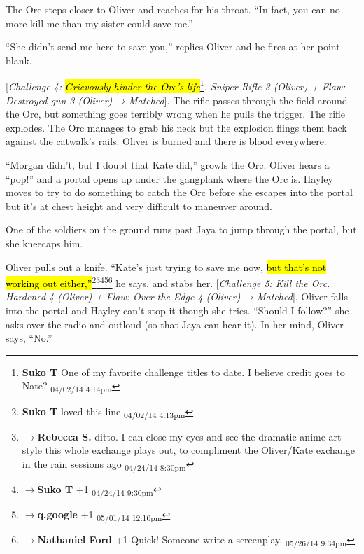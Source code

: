 The Orc steps closer to Oliver and reaches for his throat.  ``In fact, you can no more kill me than my sister could save me.''



``She didn't send me here to save you,'' replies Oliver and he fires at her point blank.



{[}\textit{Challenge 4: }\textit{\hl{Grievously hinder the Orc's life}}\footnote{\textbf{Suko T }One of my favorite challenge titles to date.  I believe credit goes to Nate? \textsubscript{04/02/14 4:14pm}}\textit{.  Sniper Rifle 3 (Oliver) + }\textit{ {\color[RGB]{255,0,0}Flaw: Destroyed gun 3 (Oliver) } }\textit{→ Matched}{]}.  The rifle passes through the field around the Orc, but something goes terribly wrong when he pulls the trigger.  The rifle explodes.  The Orc manages to grab his neck but the explosion flings them back against the catwalk's rails.  Oliver is burned and there is blood everywhere.



``Morgan didn't, but I doubt that Kate did,'' growls the Orc.  Oliver hears a ``pop!'' and a portal opens up under the gangplank where the Orc is.  Hayley moves to try to do something to catch the Orc before she escapes into the portal but it's at chest height and very difficult to maneuver around.



One of the soldiers on the ground runs past Jaya to jump through the portal, but she kneecaps him. 



Oliver pulls out a knife.  ``Kate's just trying to save me now, \hl{but that's not working out either,''}\footnote{\textbf{Suko T }loved this line \textsubscript{04/02/14 4:13pm}}\footnote{$\rightarrow$\textbf{Rebecca S. }ditto.  I can close my eyes and see the dramatic anime art style this whole exchange plays out, to compliment the Oliver/Kate exchange in the rain sessions ago \textsubscript{04/24/14 8:30pm}}\footnote{$\rightarrow$\textbf{Suko T }+1 \textsubscript{04/24/14 9:30pm}}\footnote{$\rightarrow$\textbf{q.google }+1 \textsubscript{05/01/14 12:10pm}}\footnote{$\rightarrow$\textbf{Nathaniel Ford }+1 Quick! Someone write a screenplay. \textsubscript{05/26/14 9:34pm}} he says, and stabs her.  {[}\textit{Challenge 5: Kill the Orc.  Hardened 4 (Oliver) + }\textit{ {\color[RGB]{255,0,0}Flaw: Over the Edge 4 (Oliver) } }\textit{→ Matched}{]}.  Oliver falls into the portal and Hayley can't stop it though she tries.  ``Should I follow?'' she asks over the radio and outloud (so that Jaya can hear it).  In her mind, Oliver says, ``No.''




